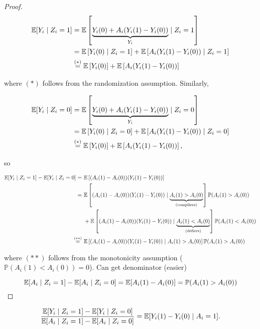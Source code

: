 \begin{proof}

\begin{align*}
\E[Y_i \mid Z_i = 1] & = \E \left[  \underbrace{Y_i(0) + A_i(Y_i(1) - Y_i(0))}_{Y_i} \mid Z_i  = 1 \right]
\\ & = \E \left[  Y_i(0) \mid Z_i  = 1 \right] +  \E \left[   A_i(Y_i(1) - Y_i(0))  \mid Z_i  = 1 \right]
\\ & \stackrel{(*)}{=} \E \left[  Y_i(0)  \right] +  \E \left[   A_i(Y_i(1) - Y_i(0))   \right] 
\end{align*}

where \((*)\) follows from the randomization assumption. Similarly,

\begin{align*}
\E[Y_i \mid Z_i = 0] & = \E \left[  \underbrace{Y_i(0) + A_i(Y_i(1) - Y_i(0))}_{Y_i} \mid Z_i = 0 \right]
\\ & = \E \left[  Y_i(0) \mid Z_i = 0 \right] +  \E \left[   A_i(Y_i(1) - Y_i(0))  \mid Z_i = 0 \right]
\\ & \stackrel{(*)}{=} \E \left[  Y_i(0)  \right] +  \E \left[   A_i(Y_i(1) - Y_i(0))   \right] ,
\end{align*}

so

\begin{align*}
\E[Y_i \mid Z_i = 1] - \E[Y_i \mid Z_i = 0]  =~ & \E\left[(A_i(1) - A_i(0))(Y_i(1) - Y_i(0)) \right]
\\ = ~& \E\left[(A_i(1) - A_i(0))(Y_i(1) - Y_i(0)) \mid \underbrace{A_i(1) > A_i(0)}_{\text{(compliers)}} \right] \mathbb{P}(A_i(1) > A_i(0)) 
\\ & +  \E\left[(A_i(1) - A_i(0))(Y_i(1) - Y_i(0)) \mid \underbrace{A_i(1) < A_i(0)}_{\text{(defiers)}} \right] \mathbb{P}(A_i(1) < A_i(0))
\\  \stackrel{(**)}{=}  ~& \E\left[(A_i(1) - A_i(0))(Y_i(1) - Y_i(0)) \mid A_i(1) > A_i(0) \right] \mathbb{P}(A_i(1) > A_i(0)) 
\end{align*}

where \((**)\) follows from the monotonicity assumption (\(\mathbb{P}(A_i(1) < A_i(0)) = 0\)). Can get denominator (easier)

\[
\E[A_i \mid Z_i = 1] - \E[A_i \mid Z_i = 0]  = \E[A_i(1) - A_i(0)] = \mathbb{P}(A_i(1) > A_i(0))
\]

\end{proof}

\begin{lemma}

\[
\frac{\E[Y_i \mid Z_i =1] - \E[Y_i \mid Z_i = 0]}{\E[A_i \mid Z_i  =1] - \E[A_i \mid Z_i = 0]} = \E[Y_i(1) - Y_i(0) \mid A_i = 1].
\]

\end{lemma}

